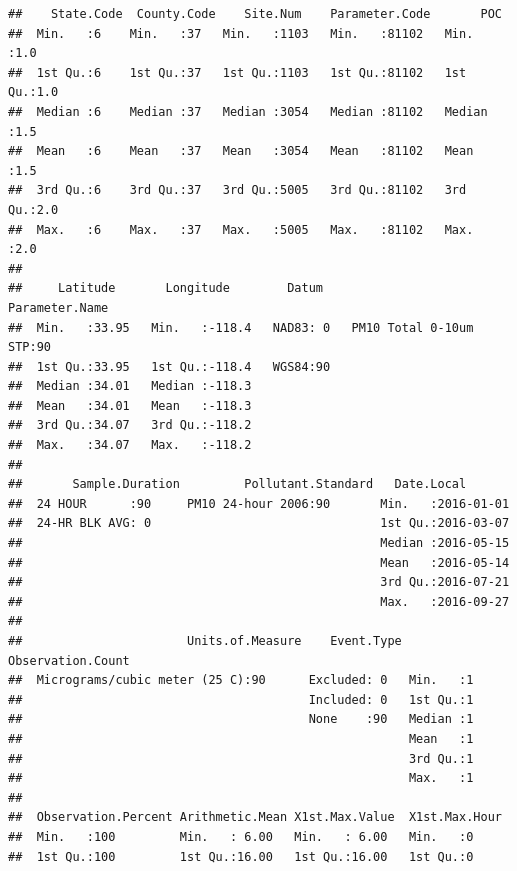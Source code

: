\documentclass[]{book}
\begin{document}
\begin{verbatim}
##    State.Code  County.Code    Site.Num    Parameter.Code       POC     
##  Min.   :6    Min.   :37   Min.   :1103   Min.   :81102   Min.   :1.0  
##  1st Qu.:6    1st Qu.:37   1st Qu.:1103   1st Qu.:81102   1st Qu.:1.0  
##  Median :6    Median :37   Median :3054   Median :81102   Median :1.5  
##  Mean   :6    Mean   :37   Mean   :3054   Mean   :81102   Mean   :1.5  
##  3rd Qu.:6    3rd Qu.:37   3rd Qu.:5005   3rd Qu.:81102   3rd Qu.:2.0  
##  Max.   :6    Max.   :37   Max.   :5005   Max.   :81102   Max.   :2.0  
##                                                                        
##     Latitude       Longitude        Datum                  Parameter.Name
##  Min.   :33.95   Min.   :-118.4   NAD83: 0   PM10 Total 0-10um STP:90    
##  1st Qu.:33.95   1st Qu.:-118.4   WGS84:90                               
##  Median :34.01   Median :-118.3                                          
##  Mean   :34.01   Mean   :-118.3                                          
##  3rd Qu.:34.07   3rd Qu.:-118.2                                          
##  Max.   :34.07   Max.   :-118.2                                          
##                                                                          
##       Sample.Duration         Pollutant.Standard   Date.Local        
##  24 HOUR      :90     PM10 24-hour 2006:90       Min.   :2016-01-01  
##  24-HR BLK AVG: 0                                1st Qu.:2016-03-07  
##                                                  Median :2016-05-15  
##                                                  Mean   :2016-05-14  
##                                                  3rd Qu.:2016-07-21  
##                                                  Max.   :2016-09-27  
##                                                                      
##                       Units.of.Measure    Event.Type Observation.Count
##  Micrograms/cubic meter (25 C):90      Excluded: 0   Min.   :1        
##                                        Included: 0   1st Qu.:1        
##                                        None    :90   Median :1        
##                                                      Mean   :1        
##                                                      3rd Qu.:1        
##                                                      Max.   :1        
##                                                                       
##  Observation.Percent Arithmetic.Mean X1st.Max.Value  X1st.Max.Hour
##  Min.   :100         Min.   : 6.00   Min.   : 6.00   Min.   :0    
##  1st Qu.:100         1st Qu.:16.00   1st Qu.:16.00   1st Qu.:0    

\end{verbatim}
\end{document}
